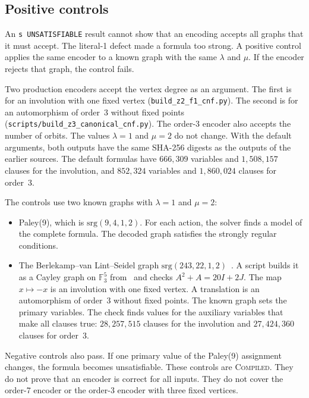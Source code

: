 \documentclass{article}
\theoremstyle{plain}
\theoremstyle{definition}
\numberwithin{equation}{section}
\begin{document}
\subsection{Positive controls}
\label{sec:positive_controls}

An \texttt{s UNSATISFIABLE} result cannot show that an encoding accepts all graphs that it must accept. The literal-1 defect made a formula too strong. A positive control applies the same encoder to a known graph with the same $\lambda$ and $\mu$. If the encoder rejects that graph, the control fails.

Two production encoders accept the vertex degree as an argument. The first is for an involution with one fixed vertex (\texttt{build\_z2\_f1\_cnf.py}). The second is for an automorphism of order~3 without fixed points (\texttt{scripts/build\_z3\_canonical\_cnf.py}). The order-3 encoder also accepts the number of orbits. The values $\lambda = 1$ and $\mu = 2$ do not change. With the default arguments, both outputs have the same SHA-256 digests as the outputs of the earlier sources. The default formulas have $666{,}309$ variables and $1{,}508{,}157$ clauses for the involution, and $852{,}324$ variables and $1{,}860{,}024$ clauses for order~3.

The controls use two known graphs with $\lambda = 1$ and $\mu = 2$:
\begin{itemize}
 \item Paley(9), which is $\mathrm{srg}(9, 4, 1, 2)$. For each action, the solver finds a model of the complete formula. The decoded graph satisfies the strongly regular conditions.
 \item The Berlekamp--van Lint--Seidel graph $\mathrm{srg}(243, 22, 1, 2)$~\cite{berlekamp1973strongly}. A script builds it as a Cayley graph on $\mathbb{F}_3^5$ from~\cite{zaw2020deza} and checks $A^2 + A = 20I + 2J$. The map $x \mapsto -x$ is an involution with one fixed vertex. A translation is an automorphism of order~3 without fixed points. The known graph sets the primary variables. The check finds values for the auxiliary variables that make all clauses true: $28{,}257{,}515$ clauses for the involution and $27{,}424{,}360$ clauses for order~3.
\end{itemize}
Negative controls also pass. If one primary value of the Paley(9) assignment changes, the formula becomes unsatisfiable.
These controls are \textsc{Compiled}. They do not prove that an encoder is correct for all inputs. They do not cover the order-7 encoder or the order-3 encoder with three fixed vertices.
\end{document}
